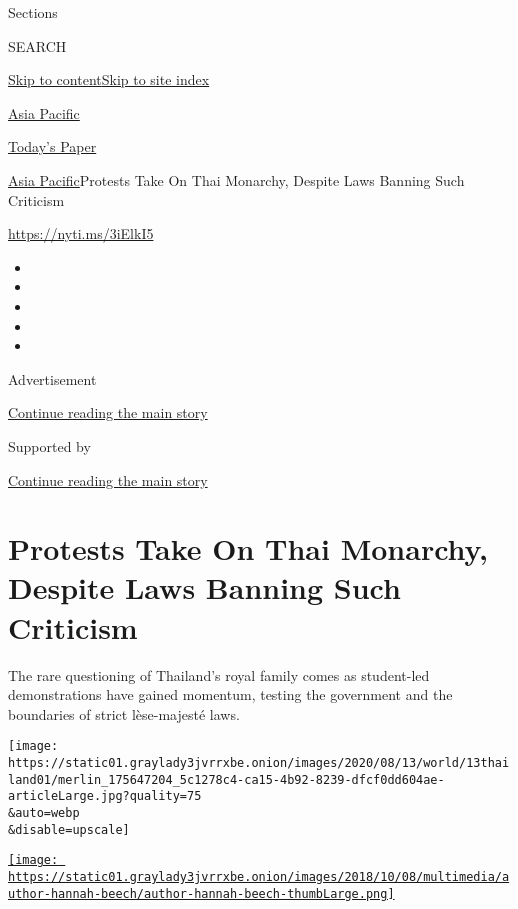 Sections

SEARCH

\protect\hyperlink{site-content}{Skip to
content}\protect\hyperlink{site-index}{Skip to site index}

\href{https://www.nytimes3xbfgragh.onion/section/world/asia}{Asia
Pacific}

\href{https://myaccount.nytimes3xbfgragh.onion/auth/login?response_type=cookie\&client_id=vi}{}

\href{https://www.nytimes3xbfgragh.onion/section/todayspaper}{Today's
Paper}

\href{/section/world/asia}{Asia Pacific}\textbar{}Protests Take On Thai
Monarchy, Despite Laws Banning Such Criticism

\url{https://nyti.ms/3iElkI5}

\begin{itemize}
\item
\item
\item
\item
\item
\end{itemize}

Advertisement

\protect\hyperlink{after-top}{Continue reading the main story}

Supported by

\protect\hyperlink{after-sponsor}{Continue reading the main story}

\hypertarget{protests-take-on-thai-monarchy-despite-laws-banning-such-criticism}{%
\section{Protests Take On Thai Monarchy, Despite Laws Banning Such
Criticism}\label{protests-take-on-thai-monarchy-despite-laws-banning-such-criticism}}

The rare questioning of Thailand's royal family comes as student-led
demonstrations have gained momentum, testing the government and the
boundaries of strict lèse-majesté laws.

\texttt{[image: https://static01.graylady3jvrrxbe.onion/images/2020/08/13/world/13thailand01/merlin\_175647204\_5c1278c4-ca15-4b92-8239-dfcf0dd604ae-articleLarge.jpg?quality=75\\\&auto=webp\\\&disable=upscale]}

\href{https://www.nytimes3xbfgragh.onion/by/hannah-beech}{\texttt{[image: https://static01.graylady3jvrrxbe.onion/images/2018/10/08/multimedia/author-hannah-beech/author-hannah-beech-thumbLarge.png]}}

